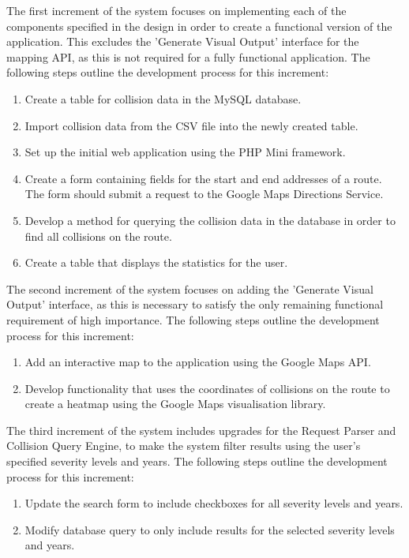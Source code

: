 \documentclass[authoryearcitations]{UoYCSproject}
\begin{document}
The first increment of the system focuses on implementing each of the components specified in the design in order to create a functional version of the application. This excludes the 'Generate Visual Output' interface for the mapping API, as this is not required for a fully functional application. The following steps outline the development process for this increment:

\begin{enumerate}
	\item Create a table for collision data in the MySQL database.
	\item Import collision data from the CSV file into the newly created table.
	\item Set up the initial web application using the PHP Mini framework.
	\item Create a form containing fields for the start and end addresses of a route. The form should submit a request to the Google Maps Directions Service.
	\item Develop a method for querying the collision data in the database in order to find all collisions on the route.
	\item Create a table that displays the statistics for the user.
\end{enumerate}

The second increment of the system focuses on adding the 'Generate Visual Output' interface, as this is necessary to satisfy the only remaining functional requirement of high importance. The following steps outline the development process for this increment:
\begin{enumerate}
	\item Add an interactive map to the application using the Google Maps API.
	\item Develop functionality that uses the coordinates of collisions on the route to create a heatmap using the Google Maps visualisation library.
\end{enumerate}

The third increment of the system includes upgrades for the Request Parser and Collision Query Engine, to make the system filter results using the user's specified severity levels and years. The following steps outline the development process for this increment:
\begin{enumerate}
	\item Update the search form to include checkboxes for all severity levels and years.
	\item Modify database query to only include results for the selected severity levels and years.
\end{enumerate}
\end{document}
